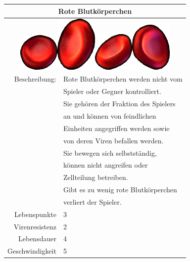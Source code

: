\documentclass[11pt]{article}
\begin{document}
\begin{tabular}{|r|l|}
\hline
\multicolumn{2}{c}{Rote Blutk\"orperchen}\\\hline\hline
\multicolumn{2}{c}{\includegraphics[width=2cm]{redbloodcella.png}\quad\quad\includegraphics[width=2cm]{redbloodcellb.png}\quad\quad\includegraphics[width=2cm]{redbloodcellc.png}\quad\quad\includegraphics[width=2cm]{redbloodcelld.png}}\\\hline\hline
Beschreibung:	& Rote Blutk\"orperchen werden nicht vom\\
			& Spieler oder Gegner kontrolliert.\\
			& Sie geh\"oren der Fraktion des Spielers\\
			& an und k\"onnen von feindlichen\\
			& Einheiten angegriffen werden sowie\\
			& von deren Viren befallen werden.\\
			& Sie bewegen sich selbstst\"andig,\\
			& k\"onnen nicht angreifen oder\\
			& Zellteilung betreiben.\\
			& Gibt es zu wenig rote Blutk\"orperchen\\
			& verliert der Spieler.\\\hline
Lebenspunkte	& 3\\\hline
Virenresistenz	& 2\\\hline
Lebensdauer		& 4\\\hline
Geschwindigkeit	& 5\\\hline
\end{tabular}
\end{document}
